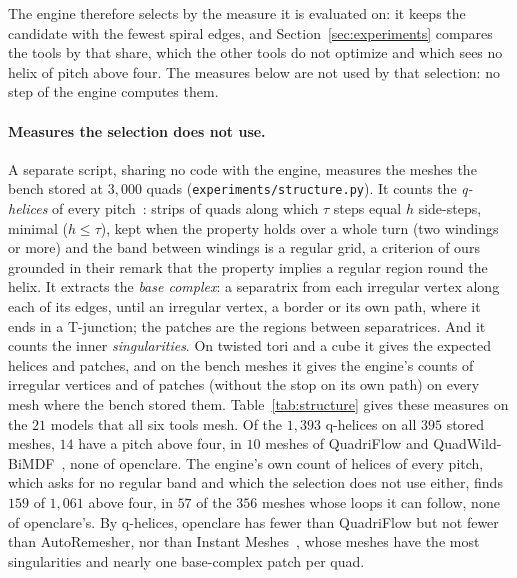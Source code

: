 \documentclass[11pt,a4paper]{article}
\begin{document}
The engine therefore selects by the measure it is evaluated on: it keeps the
candidate with the fewest spiral edges, and Section~\ref{sec:experiments}
compares the tools by that share, which the other tools do not optimize and
which sees no helix of pitch above four. The measures below are not used by
that selection: no step of the engine computes them.

\paragraph{Measures the selection does not use.}
A separate script, sharing no code with the engine, measures the meshes the
bench stored at $3{,}000$ quads (\texttt{experiments/structure.py}). It
counts the \emph{q-helices} of every pitch~\cite{bommes2011structure}: strips
of quads along which $\tau$ steps equal $h$ side-steps, minimal ($h \le
\tau$), kept when the property holds over a whole turn (two windings or more)
and the band between windings is a regular grid, a criterion of ours
grounded in their remark that the property implies a regular region round
the helix. It extracts the \emph{base
complex}: a separatrix from each irregular vertex along each of its edges,
until an irregular vertex, a border or its own path, where it ends in a
T-junction; the patches are the regions between separatrices. And it counts
the inner \emph{singularities}. On twisted tori and a cube it gives the
expected helices and patches, and on the bench meshes it gives the engine's
counts of irregular vertices and of patches (without the stop on its own
path) on every mesh where the bench stored them. Table~\ref{tab:structure} gives these measures on the
$21$ models that all six tools mesh. Of the $1{,}393$ q-helices on all $395$
stored meshes, $14$ have a pitch above four, in $10$ meshes of QuadriFlow and
QuadWild-BiMDF~\cite{pietroni2021reliable,heistermann2023bimdf}, none of
openclare. The engine's own count of helices of every
pitch, which asks for no regular band and which the selection does not use
either, finds $159$ of $1{,}061$ above four, in $57$ of the $356$ meshes whose
loops it can follow, none of openclare's. By q-helices, openclare has fewer
than QuadriFlow but not fewer than AutoRemesher, nor than Instant
Meshes~\cite{jakob2015instant}, whose meshes have the most singularities and nearly one base-complex patch
per quad.
\end{document}
